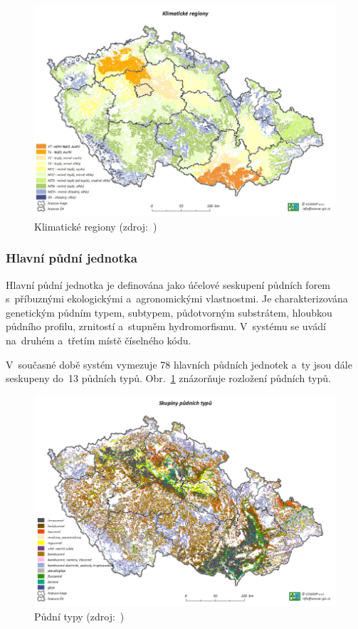 	\begin{figure}[H]
		\centering
		\includegraphics[width=.9\textwidth]{./pictures/klimaticky_region.png}
		\caption[Klimatické regiony]{Klimatické regiony (zdroj:~\citep{vumop_bpej})}
		\label{fig:klimaticke_regiony}
 	\end{figure}

\subsubsection{Hlavní půdní jednotka}
\label{hpj}

Hlavní půdní jednotka je definována jako účelové seskupení půdních forem s~příbuz\-nými ekologickými a~agronomickými vlastnostmi. Je charakterizována genetickým půdním typem, subtypem, půdotvorným substrátem, hloubkou půdního profilu, zrnitostí a~stupněm hydromorfismu. V~systému  se uvádí na~druhém a~třetím místě číselného kódu.

V~současné době systém  vymezuje 78 hlavních půdních jednotek a~ty jsou dále seskupeny do~13 půdních typů. Obr.~\ref{fig:klimaticke_regiony} znázorňuje rozložení půdních typů.

	\begin{figure}[H]
		\centering
		\includegraphics[width=.9\textwidth]{./pictures/pudni_typy.png}
		\caption[Půdní typy]{Půdní typy (zdroj:~\citep{vumop_bpej})}
		\label{fig:pudni_typy}
 	\end{figure}

